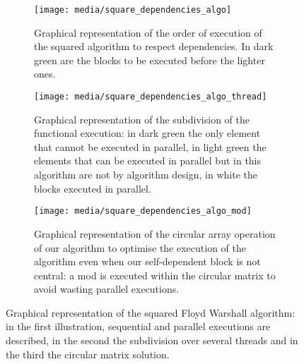 \begin{figure}[htbp]
    \centering
    \begin{subfigure}[t]{0.3\textwidth}
        \texttt{[image: media/square\_dependencies\_algo]}
        
        \caption{Graphical representation of the order of execution of the squared algorithm to respect dependencies. In dark green are the blocks to be executed before the lighter ones.}
        \label{fig:square-dependecies-algo}
    \end{subfigure}
    \begin{subfigure}[t]{0.3\textwidth}
        \texttt{[image: media/square\_dependencies\_algo\_thread]}
        
        \caption{Graphical representation of the subdivision of the functional execution: in dark green the only element that cannot be executed in parallel, in light green the elements that can be executed in parallel but in this algorithm are not by algorithm design, in white the blocks executed in parallel.}
        \label{fig:square-dependecies-thread}
    \end{subfigure}
    \begin{subfigure}[t]{0.3\textwidth}
        \texttt{[image: media/square\_dependencies\_algo\_mod]}
        
        \caption{Graphical representation of the circular array operation of our algorithm to optimise the execution of the algorithm even when our self-dependent block is not central: a mod is executed within the circular matrix to avoid wasting parallel executions.}
        \label{fig:square-dependecies-circular}
    \end{subfigure}
    \caption{Graphical representation of the squared Floyd Warshall algorithm: in the first illustration, sequential and parallel executions are described, in the second the subdivision over several threads and in the third the circular matrix solution.}
        \label{fig:square-algo}
\end{figure}

\FloatBarrier
